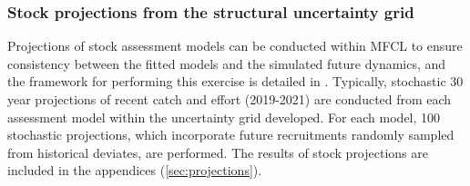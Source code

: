 \subsubsection{Stock projections from the structural uncertainty grid}
\label{sec:method_projections}

Projections of stock assessment models can be conducted within MFCL to ensure consistency between the fitted models and the simulated future dynamics, and the framework for performing this exercise is detailed in \citet{pilling_approaches_2016}. Typically, stochastic 30 year projections of recent catch and effort (2019-2021) are conducted from each assessment model within the uncertainty grid developed. For each model, 100 stochastic projections, which incorporate future recruitments randomly sampled from historical deviates, are performed. The results of stock projections are included in the appendices (\autoref{sec:projections}).
